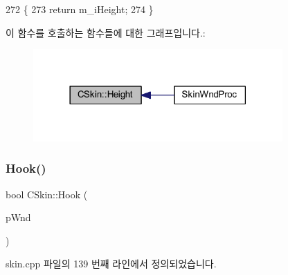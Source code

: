 \begin{DoxyCode}
272 \{
273   \textcolor{keywordflow}{return} m\_iHeight;
274 \}
\end{DoxyCode}
이 함수를 호출하는 함수들에 대한 그래프입니다.\+:
\nopagebreak
\begin{figure}[H]
\begin{center}
\leavevmode
\includegraphics[width=270pt]{class_c_skin_a26de0d121ce1811feea27cc30f4c2f70_icgraph}
\end{center}
\end{figure}
\mbox{\label{class_c_skin_a4897349a9944fe2e2ee9cfdc4f0baf47}} 
\subsubsection{\texorpdfstring{Hook()}{Hook()}}
{\footnotesize\ttfamily bool C\+Skin\+::\+Hook (\begin{DoxyParamCaption}\item[{C\+Wnd $\ast$}]{p\+Wnd }\end{DoxyParamCaption})}



skin.\+cpp 파일의 139 번째 라인에서 정의되었습니다.


